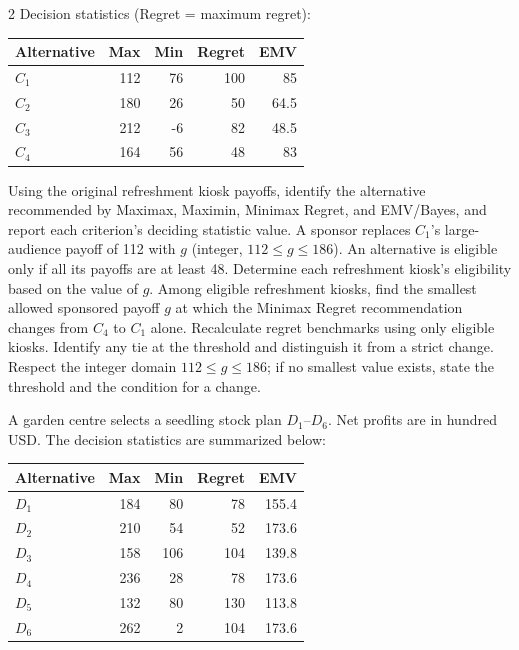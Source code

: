\begin{multicols}{2}
Decision statistics (Regret = maximum regret):

\begin{center}\small\setlength{\tabcolsep}{4pt}
	\begin{tabular}{lrrrr}\toprule
		Alternative & Max & Min & Regret & EMV\\ \midrule
				$C_1$ & 112 & 76 & 100 & 85\\
		$C_2$ & 180 & 26 & 50 & 64.5\\
		$C_3$ & 212 & -6 & 82 & 48.5\\
		$C_4$ & 164 & 56 & 48 & 83\\
		\bottomrule
	\end{tabular}
\end{center}

\noindent Using the original refreshment kiosk payoffs, identify the alternative recommended by Maximax, Maximin, Minimax Regret, and EMV/Bayes, and report each criterion's deciding statistic value.  A sponsor replaces $C_1$'s large-audience payoff of 112 with $g$ (integer, $112\leq g\leq186$). An alternative is eligible only if all its payoffs are at least 48. Determine each refreshment kiosk's eligibility based on the value of $g$.  Among eligible refreshment kiosks, find the smallest allowed sponsored payoff $g$ at which the Minimax Regret recommendation changes from $C_4$ to $C_1$ alone. Recalculate regret benchmarks using only eligible kiosks. Identify any tie at the threshold and distinguish it from a strict change. Respect the integer domain $112\leq g\leq186$; if no smallest value exists, state the threshold and the condition for a change. 

A garden centre selects a seedling stock plan $D_1$--$D_6$. Net profits are in hundred USD. The decision statistics are summarized below:

\vspace{-3mm}
\begin{center}\small\setlength{\tabcolsep}{4pt}
	\begin{tabular}{lrrrr}\toprule
		Alternative & Max & Min & Regret & EMV\\ \midrule
		$D_1$ & 184 & 80 & 78 & 155.4\\
		$D_2$ & 210 & 54 & 52 & 173.6\\
		$D_3$ & 158 & 106 & 104 & 139.8\\
		$D_4$ & 236 & 28 & 78 & 173.6\\
		$D_5$ & 132 & 80 & 130 & 113.8\\
		$D_6$ & 262 & 2 & 104 & 173.6\\
		\bottomrule
	\end{tabular}
\end{center}
\vspace{-3mm}


\end{multicols}
